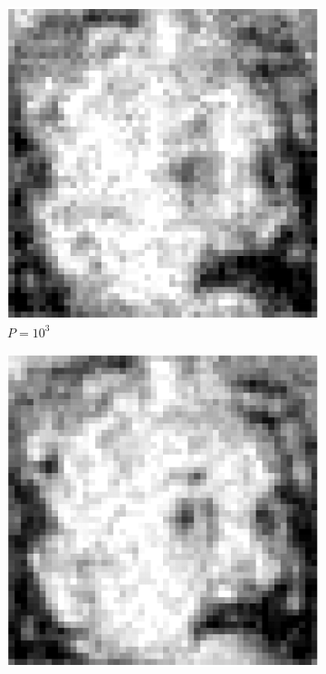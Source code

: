 \documentclass[english,11pt]{article}
\numberwithin{equation}{section}
\theoremstyle{plain}
\theoremstyle{definition}
\theoremstyle{remark}
\theoremstyle{plain}
\theoremstyle{remark}
\theoremstyle{plain}
\theoremstyle{plain}
\begin{document}
\begin{figure}[h!]
	\begin{subfigure}[h]{0.25\textwidth}
		\centering
		\includegraphics[scale=0.4]{Einstein_1e3}
		\caption{$P =10^3$}
	\end{subfigure}%
	\begin{subfigure}[h]{0.25\textwidth}
		\centering
		\includegraphics[scale=0.4]{Einstein_1e4}

\end{subfigure}
\end{figure}
\end{document}
